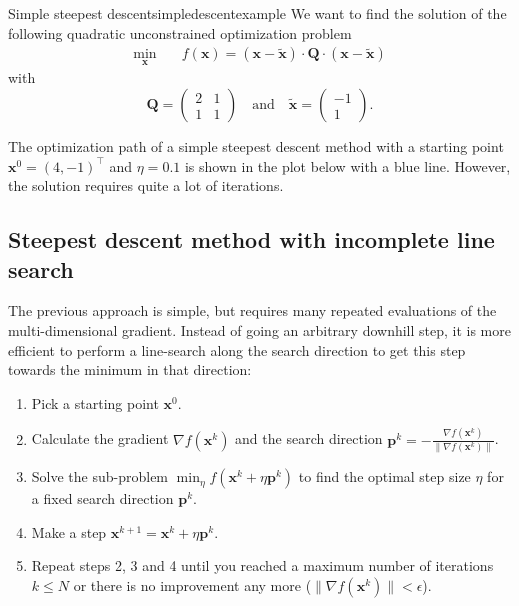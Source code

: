 \begin{example}{Simple steepest descent}{simpledescentexample}
    We want to find the solution of the following quadratic unconstrained optimization problem
    \begin{equation}
        \begin{aligned}
            \min_{\mathbf{x}} \quad & f(\mathbf{x})= (\mathbf{x}-\tilde{\mathbf{x}}) \cdot \mathbf{Q} \cdot (\mathbf{x}-\tilde{\mathbf{x}})
        \end{aligned}
        \label{eq:simpledescent_example}
    \end{equation}
    with 
    \begin{equation}
        \mathbf{Q} = 
        \begin{pmatrix}
        2 & 1 \\
        1 & 1 
        \end{pmatrix}
        \quad \text{and} \quad
        \tilde{\mathbf{x}} = 
        \begin{pmatrix}
        -1\\
        1 
        \end{pmatrix}
        .
    \end{equation}

    The optimization path of a simple steepest descent method with a starting point $\mathbf{x}^0= (4, -1)^\top$ and $\eta=0.1$ is shown in the plot below with a blue line. However, the solution requires quite a lot of iterations.

    \begin{center}
        
    \end{center}   
\end{example}

\subsection{Steepest descent method with incomplete line search}
The previous approach is simple, but requires many repeated evaluations of the multi-dimensional gradient. Instead of going an arbitrary downhill step, it is more efficient to perform a line-search along the search direction to get this step towards the minimum in that direction: 
\begin{enumerate}
    \item Pick a starting point $\mathbf{x}^0$.
    \item Calculate the gradient $\nabla f(\mathbf{x}^k)$ and the search direction $\mathbf{p}^k = - \frac{\nabla f(\mathbf{x}^k)}{\lVert \nabla f(\mathbf{x}^k) \rVert}$.
    \item Solve the sub-problem $\min_{\eta} f(\mathbf{x}^k + \eta \mathbf{p}^k)$ to find the optimal step size $\eta$ for a fixed search direction $\mathbf{p}^k$.
    \item Make a step $\mathbf{x}^{k+1} = \mathbf{x}^k + \eta \mathbf{p}^k$.
    \item Repeat steps 2, 3 and 4 until you reached a maximum number of iterations $k \le N$ or there is no improvement any more ($ \lVert \nabla f(\mathbf{x}^k) \rVert < \epsilon$). 
\end{enumerate}

